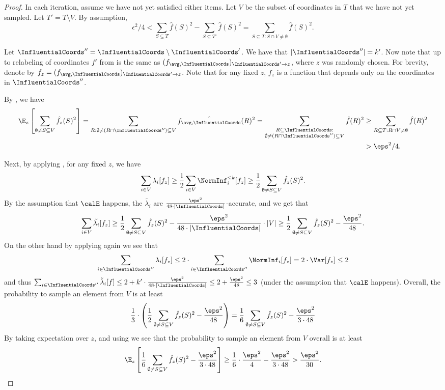 \begin{proof}
In each iteration, assume we have not yet satisfied either items. Let $V$ be the subset of coordinates in $T$ that we have  not yet sampled.
Let $T' = T \setminus V$. By assumption, $$\epsilon^2/4<\sum_{S\subseteq T} \hat{f}(S)^2- \sum_{S\subseteq T'} \hat{f}(S)^2 =  \sum_{S\subseteq T : S \cap V \neq \emptyset} \hat{f}(S)^2.$$

Let $\InfluentialCoords'' = \InfluentialCoords\setminus \InfluentialCoords'$. We have that $|\InfluentialCoords''| = k'$.
Now note that up to relabeling of coordinates 
$f'$ from  is the same as $(f_{\avg, \InfluentialCoords})_{\InfluentialCoords' \to z}$,
where $z$ was randomly chosen.
For brevity, denote by $f_z = (f_{\avg, \InfluentialCoords})_{\InfluentialCoords' \to z}$. Note that for any fixed $z$, $f_z$ is a function that depends only on the coordinates in $\InfluentialCoords''$.


By , we have 
\begin{align}
\E_z\left[ \sum_{\emptyset \neq S \subseteq V}\hat{f_z}(S)^2\right] 
= \sum_{R:  \emptyset \neq (R\cap \InfluentialCoords'') \subseteq V}\hat{f_{\avg, \InfluentialCoords}}(R)^2 =
\sum_{\substack{R\subseteq \InfluentialCoords : \\ \emptyset \neq (R\cap \InfluentialCoords'') \subseteq V}}\hat{f}(R)^2 
&\ge 
\sum_{R\subseteq T : R \cap V \neq \emptyset} \hat{f}(R)^2 \nonumber\\&> \eps^2/4.\label{eq:fz}
\end{align}

Next, by applying , for any fixed $z$, we have
$$
\sum_{i\in V} \lambda_i[f_z]\ge \frac{1}{2} \sum_{i\in V} \NormInf_i^{\le k}[f_z]\ge \frac{1}{2} \sum_{\emptyset \neq S \subseteq V} \hat{f_z}(S)^2.
$$
By the assumption that  $\calE$ happens, the $\tilde{\lambda_i}$ are $\frac{\eps^2}{48\cdot |\InfluentialCoords|}$-accurate, and we get that 
$$
\sum_{i \in V} \tilde{\lambda_i}[f_z] \ge \frac{1}{2} \sum_{\emptyset \neq S \subseteq V}\hat{f_z}(S)^2 - \frac{\eps^2}{48\cdot |\InfluentialCoords|} \cdot |V|
\ge \frac{1}{2} \sum_{\emptyset \neq S \subseteq V}\hat{f_z}(S)^2 - \frac{\eps^2}{48}.
$$
On the other hand by applying  again we see that $$\sum_{i\in \InfluentialCoords''} \lambda_i[f_z] \le 2\cdot \sum_{i\in \InfluentialCoords''} \NormInf_i[f_z]= 2\cdot \Var[f_z]\le 2$$ 
and thus 
$\sum_{i\in \InfluentialCoords''} \tilde{\lambda}_i[f]  \le 2 + k'\cdot \frac{\eps^2}{48\cdot |\InfluentialCoords|} \le 2 + \frac{\eps^2}{48} \le 3$ (under the assumption that $\calE$ happens).
Overall, the probability to sample an element from $V$ is at least 
$$
\frac{1}{3} \cdot \left(\frac{1}{2} \sum_{\emptyset \neq S \subseteq V}\hat{f_z}(S)^2 - \frac{\eps^2}{48}\right) 
= \frac{1}{6} \sum_{\emptyset \neq S \subseteq V}\hat{f_z}(S)^2 - \frac{\eps^2}{3\cdot 48}
$$
By taking  expectation over $z$, and using  we see that the probability to sample an element from $V$ overall is at least 
$$
\E_{z}\left[\frac{1}{6} \sum_{\emptyset \neq S \subseteq V}\hat{f_z}(S)^2 - \frac{\eps^2}{3\cdot 48}\right] 
\ge  \frac{1}{6} \cdot \frac{\eps^2}{4} - \frac{\eps^2}{3\cdot 48} > \frac{\eps^2}{30}.
$$


\end{proof}
